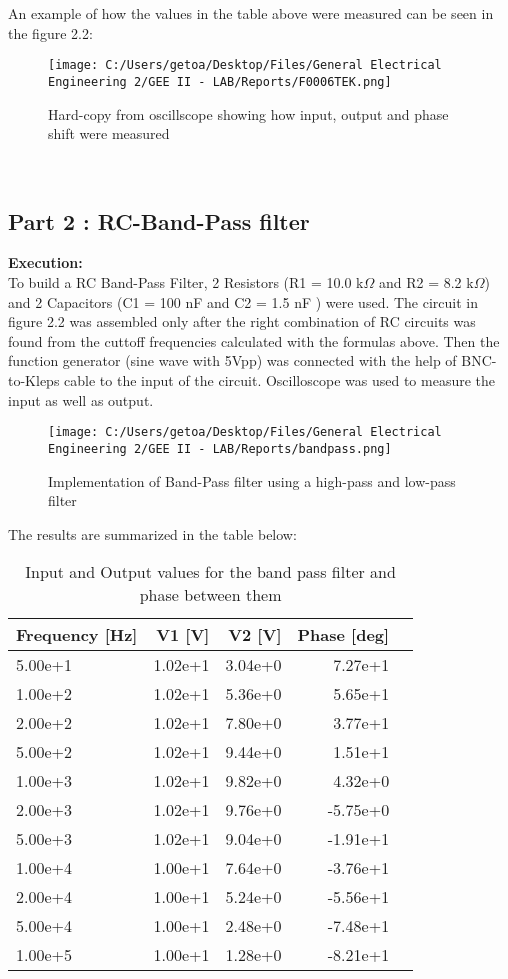 \documentclass[12pt]{report}
\begin{document}
\newpage
An example of how the values in the table above were measured can be seen in the figure 2.2:
\begin{figure}[!htp]
  \centering
  \texttt{[image: C:/Users/getoa/Desktop/Files/General Electrical Engineering 2/GEE II - LAB/Reports/F0006TEK.png]}
  \caption{Hard-copy from oscillscope showing how input, output and phase shift were measured}
\end{figure}\\
\newpage
\vspace{-1cm}
\subsection {Part 2 : RC-Band-Pass filter }
\textbf{Execution:}\\
To build a RC Band-Pass Filter, 2 Resistors (R1 = 10.0 k$\Omega$ and R2 = 8.2 k$ \Omega$) and 2 Capacitors (C1 = 100 nF and C2 = 1.5 nF ) were used. The circuit in figure 2.2 was assembled only after the right combination of RC circuits was found from the cuttoff frequencies calculated with the formulas above. Then the function generator (sine wave with 5Vpp) was connected with the help of BNC-to-Kleps cable to the input of the circuit. Oscilloscope was used to measure the input as well as output.\\
\begin{figure}[!htp]
\centering
\texttt{[image: C:/Users/getoa/Desktop/Files/General Electrical Engineering 2/GEE II - LAB/Reports/bandpass.png]}
\caption{Implementation of Band-Pass filter using a high-pass and low-pass filter}
\end{figure}
The results are summarized in the table below: 
\vspace{-1.05cm}
\begin{table}[!htp]\centering
\begin{tabular}{lrrrr}\toprule
Frequency [Hz] &V1 [V] &V2 [V] &Phase [deg] \\\midrule
5.00e+1 &1.02e+1 &3.04e+0 &7.27e+1 \\
1.00e+2 &1.02e+1 &5.36e+0 &5.65e+1 \\
2.00e+2 &1.02e+1 &7.80e+0 &3.77e+1 \\
5.00e+2 &1.02e+1 &9.44e+0 &1.51e+1 \\
1.00e+3 &1.02e+1 &9.82e+0 &4.32e+0 \\
2.00e+3 &1.02e+1 &9.76e+0 &-5.75e+0 \\
5.00e+3 &1.02e+1 &9.04e+0 &-1.91e+1 \\
1.00e+4 &1.00e+1 &7.64e+0 &-3.76e+1 \\
2.00e+4 &1.00e+1 &5.24e+0 &-5.56e+1 \\
5.00e+4 &1.00e+1 &2.48e+0 &-7.48e+1 \\
1.00e+5 &1.00e+1 &1.28e+0 &-8.21e+1 \\
\bottomrule
\end{tabular}
\caption{Input and Output values for the band pass filter and phase between them}\label{tab: }
\end{table}
\end{document}
